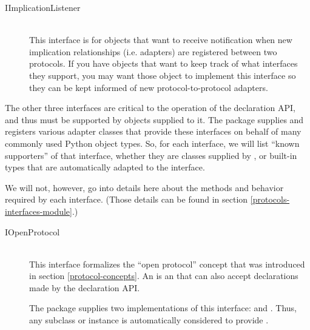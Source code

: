 \begin{verbatim%
}
\begin{verbatim%
}
\begin{verbatim%
}
\begin{verbatim%
}
\begin{verbatim%
}
\begin{verbatim%
}
\begin{description}
\item[IImplicationListener] \hfill \\
This interface is for objects that want to receive notification when new
implication relationships (i.e. adapters) are registered between two protocols.
If you have objects that want to keep track of what interfaces they support,
you may want those object to implement this interface so they can be kept
informed of new protocol-to-protocol adapters.

\end{description}

The other three interfaces are critical to the operation of the declaration API,
and thus must be supported by objects supplied to it.  The 
package supplies and registers various adapter classes that provide these
interfaces on behalf of many commonly used Python object types.  So, for each
interface, we will list ``known supporters'' of that interface, whether they
are classes supplied by , or built-in types that are
automatically adapted to the interface.

We will not, however, go into details here about the methods and behavior
required by each interface.  (Those details can be found in section
\ref{protocols-interfaces-module}.)







\begin{description}

\item[IOpenProtocol] \hfill \\
This interface formalizes the ``open protocol'' concept that was introduced
in section \ref{protocol-concepts}.  An  is an
 that can also accept declarations made by the
 declaration API.

The  package supplies two implementations of this interface:
 and .  Thus, any 
subclass or  instance is automatically considered to provide
.  


\end{description}
\end{verbatim%
}
\end{verbatim%
}
\end{verbatim%
}
\end{verbatim%
}
\end{verbatim%
}
\end{verbatim%
}
